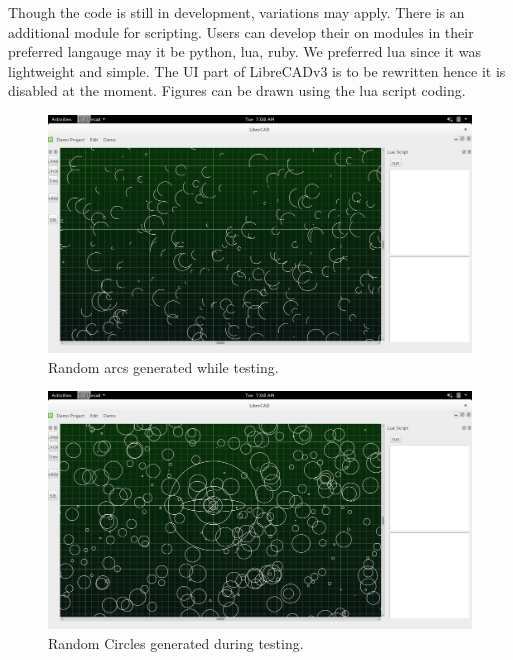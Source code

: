Though the code is still in development, variations may apply. There is an additional module for scripting. Users can develop their on modules in their preferred langauge may it be python, lua, ruby.
We preferred lua since it was lightweight and simple.
The UI part of LibreCADv3 is to be rewritten hence it is disabled at the moment. Figures can be drawn using the lua script coding.

\begin{figure}[h]
\begin{center}
\includegraphics[scale=0.3]{images/cad/randomarc.png}
\caption{ Random arcs generated while testing. }
\end{center}
\end{figure}
\begin{figure}[h]
\begin{center}
\includegraphics[scale=0.3]{images/cad/randomcircle.png}
\caption{ Random Circles generated during testing. }
\end{center}
\end{figure}
